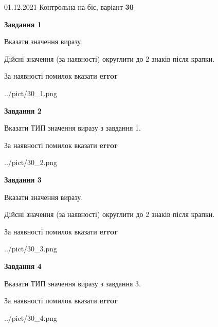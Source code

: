 \documentclass[11pt, ukrainian]{article}
\begin{document}
{01.12.2021 Контрольна на біс, варіант  \No \textbf { 30 }\par}
{
\begin {large}
{\begin {center}\textbf{Завдання 1}\end {center}}\par
Вказати значення виразу. \par
Дійсні значення (за наявності) округлити до 2 знаків після крапки. \par
За наявності помилок вказати \textbf{error}

\begin{center}
	{../pict/30_1.png}
\end{center}
\newpage

{\begin {center}\textbf{Завдання 2}\end {center}}\par
Вказати ТИП значення виразу з завдання 1. \par
За наявності помилок вказати \textbf{error}

\begin{center}
	{../pict/30_2.png}
\end{center}
\newpage

{\begin {center}\textbf{Завдання 3}\end {center}}\par
Вказати значення виразу. \par
Дійсні значення (за наявності) округлити до 2 знаків після крапки. \par
За наявності помилок вказати \textbf{error}

\begin{center}
	{../pict/30_3.png}
\end{center}
\newpage

{\begin {center}\textbf{Завдання 4}\end {center}}\par
Вказати ТИП значення виразу з завдання 3. \par
За наявності помилок вказати \textbf{error}

\begin{center}
	{../pict/30_4.png}
\end{center}
\newpage


\end{large}}
\end{document}
